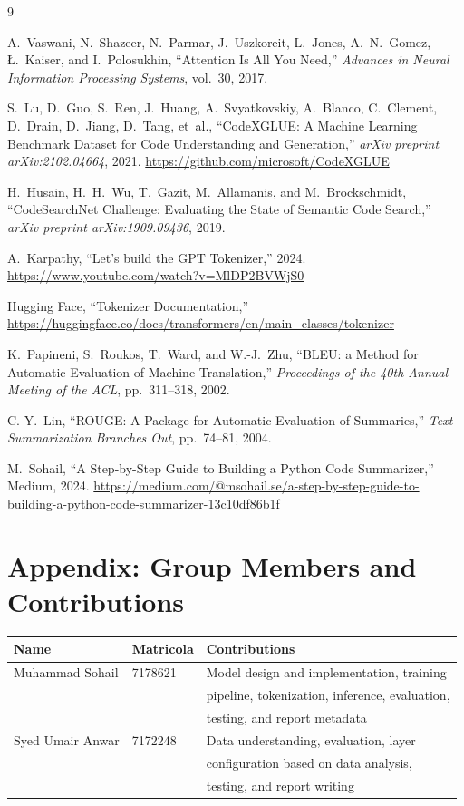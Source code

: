 \documentclass[11pt]{article}
\begin{document}
\begin{thebibliography}{9}

A.~Vaswani, N.~Shazeer, N.~Parmar, J.~Uszkoreit, L.~Jones, A.~N.~Gomez, \L.~Kaiser, and I.~Polosukhin,
``Attention Is All You Need,''
\textit{Advances in Neural Information Processing Systems}, vol.~30, 2017.

S.~Lu, D.~Guo, S.~Ren, J.~Huang, A.~Svyatkovskiy, A.~Blanco, C.~Clement, D.~Drain, D.~Jiang, D.~Tang, et~al.,
``CodeXGLUE: A Machine Learning Benchmark Dataset for Code Understanding and Generation,''
\textit{arXiv preprint arXiv:2102.04664}, 2021.
\url{https://github.com/microsoft/CodeXGLUE}

H.~Husain, H.~H.~Wu, T.~Gazit, M.~Allamanis, and M.~Brockschmidt,
``CodeSearchNet Challenge: Evaluating the State of Semantic Code Search,''
\textit{arXiv preprint arXiv:1909.09436}, 2019.

A.~Karpathy,
``Let's build the GPT Tokenizer,'' 2024.
\url{https://www.youtube.com/watch?v=MlDP2BVWjS0}

Hugging Face,
``Tokenizer Documentation,''
\url{https://huggingface.co/docs/transformers/en/main_classes/tokenizer}

K.~Papineni, S.~Roukos, T.~Ward, and W.-J.~Zhu,
``BLEU: a Method for Automatic Evaluation of Machine Translation,''
\textit{Proceedings of the 40th Annual Meeting of the ACL}, pp.~311--318, 2002.

C.-Y.~Lin,
``ROUGE: A Package for Automatic Evaluation of Summaries,''
\textit{Text Summarization Branches Out}, pp.~74--81, 2004.

M.~Sohail,
``A Step-by-Step Guide to Building a Python Code Summarizer,''
Medium, 2024.
\url{https://medium.com/@msohail.se/a-step-by-step-guide-to-building-a-python-code-summarizer-13c10df86b1f}

\end{thebibliography}

\appendix
\section*{Appendix: Group Members and Contributions}

\begin{table}[h]
\centering
\begin{tabular}{@{}lll@{}}
\toprule
\textbf{Name} & \textbf{Matricola} & \textbf{Contributions} \\
\midrule
Muhammad Sohail & 7178621 & Model design and implementation, training \\
 & & pipeline, tokenization, inference, evaluation, \\
 & & testing, and report metadata \\
Syed Umair Anwar & 7172248 & Data understanding, evaluation, layer \\
 & & configuration based on data analysis, \\
 & & testing, and report writing \\
\bottomrule
\end{tabular}
\end{table}
\end{document}
